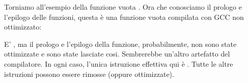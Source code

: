 
Torniamo all'esempio della funzione vuota .
Ora che conosciamo il prologo e l'epilogo delle funzioni,
questa è una funzione vuota  compilata con GCC non ottimizzato:



E' , ma il prologo e l'epilogo della funzione, probabilmente, non sono state ottimizzate e sono state lasciate cosi.
 Sembrerebbe un'altro artefatto del compilatore.
In ogni caso, l'unica istruzione effettiva qui è .
Tutte le altre istruzioni possono essere rimosse (oppure ottimizzate).

